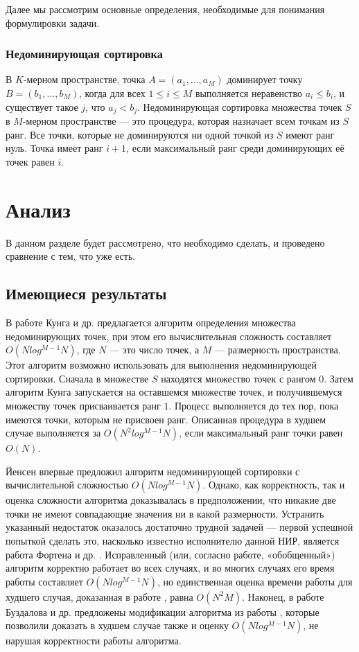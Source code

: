 Далее мы рассмотрим основные определения, необходимые для понимания формулировки задачи. 

\subsubsection{Недоминирующая сортировка}
В $K$-мерном пространстве, точка $A = (a_1,...,a_M)$ доминирует точку $B = (b_1,...,b_M)$, когда для всех $1 \leq i \leq M$ выполняется неравенство $a_i\leq b_i$, и существует такое $j$, что $a_j < b_j$. Недоминирующая сортировка множества точек $S$ в $M$-мерном пространстве — это процедура, которая назначает всем точкам из $S$ ранг. Все точки, которые не доминируются ни одной точкой из $S$ имеют ранг нуль. Точка имеет ранг $i+1$, если максимальный ранг среди доминирующих её точек равен $i$.

\section{Анализ}

В данном разделе будет рассмотрено, что необходимо сделать, и проведено сравнение с тем, что уже есть.

\subsection{Имеющиеся результаты}
В работе Кунга и др. \cite{Kung} предлагается алгоритм определения множества недоминирующих точек, при этом его вычислительная сложность составляет $O(N log^{M-1} N)$, где $N$ — это число точек, а $M$ — размерность пространства. Этот алгоритм возможно использовать для выполнения недоминирующей сортировки. Сначала в множестве $S$ находятся множество точек с рангом $0$. Затем алгоритм Кунга запускается на оставшемся множестве точек, и получившемуся множеству точек присваивается ранг $1$. Процесс выполняется до тех пор, пока имеются точки, которым не присвоен ранг. Описанная процедура в худшем случае выполняется за $O(N^2 log^{M-1} N)$, если максимальный ранг точки равен $O(N)$.

Йенсен \cite{Jensen} впервые предложил алгоритм недоминирующей сортировки с вычислительной сложностью $O(N log^{M-1} N)$. Однако, как корректность, так и оценка сложности алгоритма доказывалась в предположении, что никакие две точки не имеют совпадающие значения ни в какой размерности. Устранить указанный недостаток оказалось достаточно трудной задачей — первой успешной попыткой сделать это, насколько известно исполнителю данной НИР, является работа Фортена и др. \cite{Forton}. Исправленный (или, согласно работе, «обобщенный») алгоритм корректно работает во всех случаях, и во многих случаях его время работы составляет $O(N log^{M-1} N)$, но единственная оценка времени работы для худшего случая, доказанная в работе \cite{Jensen}, равна $O(N^2M)$. Наконец, в работе Буздалова и др. \cite{Buzdalov} предложены модификации алгоритма из работы \cite{Jensen}, которые позволили доказать в худшем случае также и оценку $O(N log^{M-1} N)$, не нарушая корректности работы алгоритма.

